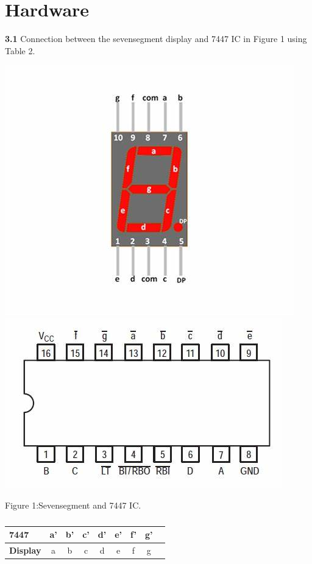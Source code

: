 \documentclass[10pt, a4paper]{article}
\begin{document}
	\section{Hardware}
	\textbf{3.1}
    Connection between the sevensegment display and 7447 IC in Figure 1 using Table 2.
    \begin{center}
\includegraphics[scale=.20]{sevenseg.jpg}
\includegraphics[scale=.20]{7447ic.jpg}
\end{center}
Figure 1:Sevensegment and 7447 IC.
	\begin{table}[htbp]
    \begin{center}
    \begin{tabular}{|l|c|c|c|c|c|c|c|c} \hline \textbf{7447}
  & a' & b' & c' & d' & e' & f' & g' \\
 \hline
\textbf{Display} & a & b & c & d & e & f & g \\ \hline
\end{tabular}   
\end{center}
\caption{\label{table:dummytable} }
\end{table}
\end{document}

